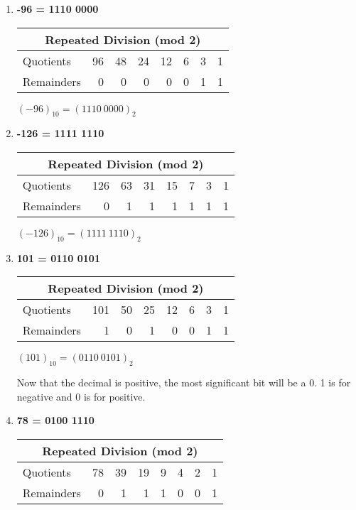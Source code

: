 \documentclass{article}
\begin{document}
\begin{enumerate}
\begin{enumerate}
				\item \textbf{-96 = 1110 0000}
					\begin{center}
					\begin{tabular}{lrrrrrrr}
						\hline
						\multicolumn{8}{c}{Repeated Division (mod 2)}\\\hline
						Quotients  & 96 & 48 & 24 & 12 & 6 & 3 & 1\\
						Remainders &  0 &  0 &  0 &  0 & 0 & 1 & 1\\\hline		
					\end{tabular}

					$(-96)_{10} = (1110\ 0000)_2$ \\
					\end{center}

				\item \textbf{-126 = 1111 1110}
					\begin{center}
					\begin{tabular}{lrrrrrrr}
						\hline
						\multicolumn{8}{c}{Repeated Division (mod 2)}\\\hline
						Quotients  & 126 & 63 & 31 & 15 & 7 & 3 & 1\\
						Remainders &   0 &  1 &  1 &  1 & 1 & 1 & 1\\\hline		
					\end{tabular}

					$(-126)_{10} = (1111\ 1110)_2$
					\end{center}

				\item \textbf{101 = 0110 0101}
					\begin{center}
					\begin{tabular}{lrrrrrrr}
						\hline
						\multicolumn{8}{c}{Repeated Division (mod 2)}\\\hline
						Quotients  & 101 & 50 & 25 & 12 & 6 & 3 & 1\\
						Remainders &   1 &  0 &  1 &  0 & 0 & 1 & 1\\\hline		
					\end{tabular}

					$(101)_{10} = (0110\ 0101)_2$ \\
					\end{center}
					Now that the decimal is positive, the most significant bit will be a 0. 1 is for negative and 0 is for positive. \\

				\item \textbf{78 = 0100 1110}
					\begin{center}
					\begin{tabular}{lrrrrrrr}
						\hline
						\multicolumn{8}{c}{Repeated Division (mod 2)}\\\hline
						Quotients  & 78 & 39 & 19 & 9 & 4 & 2 & 1\\
						Remainders &  0 &  1 &  1 & 1 & 0 & 0 & 1\\\hline		
					\end{tabular}


\end{center}
\end{enumerate}
\end{enumerate}
\end{document}
